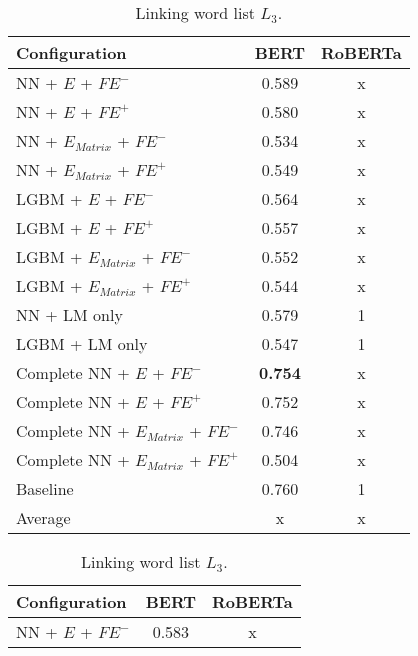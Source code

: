\begin{table}[h]
  	\tiny
  	\centering
	\begin{subtable}{.5\textwidth}
		\centering
  		\renewcommand{\arraystretch}{1.4}
   		\begin{tabular}{|| l || c | c ||}
   			\hline
   			{Configuration} & {BERT} & {RoBERTa} \\
   			\hline\hline
   			NN + $E$ + $\textit{FE}^-$ &  0.589 & x \\
 			\hline
 			NN + $E$ + $\textit{FE}^+$ & 0.580 & x \\
 			\hline
 			NN + $E_{Matrix}$ + $\textit{FE}^-$ & 0.534 & x \\
 			\hline
 			NN + $E_{Matrix}$ + $\textit{FE}^+$ & 0.549 & x \\
 			\hline
 			LGBM + $E$ + $\textit{FE}^-$ & 0.564 & x \\
 			\hline
 			LGBM + $E$ + $\textit{FE}^+$ & 0.557 & x \\
 			\hline
 			LGBM + $E_{Matrix}$ + $\textit{FE}^-$ & 0.552 & x \\
 			\hline
 			LGBM + $E_{Matrix}$ + $\textit{FE}^+$ & 0.544 & x \\
 			\hline
 			NN + LM only & 0.579 & 1 \\
 			\hline
 			LGBM + LM only & 0.547 & 1 \\
 			\hline
 			Complete NN + $E$ + $\textit{FE}^-$ & \textbf{0.754} & x \\
 			\hline
 			Complete NN + $E$ + $\textit{FE}^+$ & 0.752 & x \\
 			\hline
 			Complete NN + $E_{Matrix}$ + $\textit{FE}^-$ & 0.746 & x \\
 			\hline
 			Complete NN + $E_{Matrix}$ + $\textit{FE}^+$ & 0.504 & x \\
 			\hline
 			Baseline & 0.760 & 1\\
 			\hline
 			\hline
 			Average & x & x \\
 			\hline
		\end{tabular}
		\renewcommand{\arraystretch}{1}
  		\caption{Linking word list $L_3$.}%
  	\end{subtable}%
  	\begin{subtable}{.5\textwidth}
		\centering
  		\renewcommand{\arraystretch}{1.4}
   		\begin{tabular}{|| l || c | c ||}
   			\hline
   			{Configuration} & {BERT} & {RoBERTa} \\
   			\hline\hline
   			NN + $E$ + $\textit{FE}^-$ &  0.583 & x \\

\end{tabular}
\end{subtable}
\end{table}
